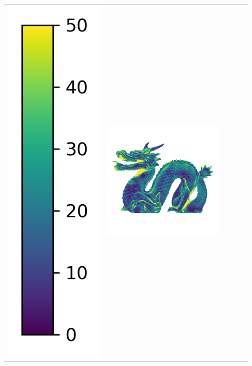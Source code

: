 \begin{center}
\begin{tabularx}{\linewidth}{@{}Y@{}Y@{}Y@{}Y@{}Y@{}Y@{}}
\includegraphics[width=0.2\linewidth]{semisynthetic/colorbar_error_vertical.png} &
\includegraphics[width=\linewidth]{semisynthetic/20150514_21_ours_err.png} &

\end{tabularx}
\end{center}
